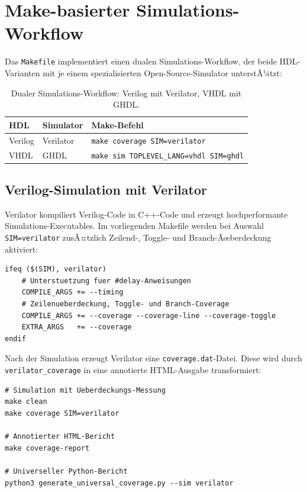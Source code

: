 ﻿\documentclass[12pt,a4paper]{report}
\begin{document}
\section{Make-basierter Simulations-Workflow}
\label{subsec:make_workflow}

Das \texttt{Makefile} implementiert einen dualen Simulations-Workflow, der beide
HDL-Varianten mit je einem spezialisierten Open-Source-Simulator unterstÃ¼tzt:

\begin{table}[H]
\centering
\begin{tabular}{|l|l|l|}
\hline
\textbf{HDL} & \textbf{Simulator} & \textbf{Make-Befehl} \\
\hline
Verilog & Verilator & \texttt{make coverage SIM=verilator} \\
VHDL    & GHDL      & \texttt{make sim TOPLEVEL\_LANG=vhdl SIM=ghdl} \\
\hline
\end{tabular}
\caption{Dualer Simulations-Workflow: Verilog mit Verilator, VHDL mit GHDL.}
\label{tab:sim_workflow}
\end{table}

\subsection{Verilog-Simulation mit Verilator}

Verilator kompiliert Verilog-Code in C++-Code und erzeugt hochperformante
Simulations-Executables. Im vorliegenden Makefile werden bei Auswahl
\texttt{SIM=verilator} zusÃ¤tzlich Zeilend-, Toggle- und Branch-Ãœberdeckung
aktiviert:

\begin{lstlisting}[style=bashstyle, caption={Verilator-spezifische Makefile-Konfiguration}]
ifeq ($(SIM), verilator)
    # Unterstuetzung fuer #delay-Anweisungen
    COMPILE_ARGS += --timing
    # Zeilenueberdeckung, Toggle- und Branch-Coverage
    COMPILE_ARGS += --coverage --coverage-line --coverage-toggle
    EXTRA_ARGS   += --coverage
endif
\end{lstlisting}

Nach der Simulation erzeugt Verilator eine \texttt{coverage.dat}-Datei.
Diese wird durch \texttt{verilator\_coverage} in eine annotierte
HTML-Ausgabe transformiert:

\begin{lstlisting}[style=bashstyle, caption={Ãœberdeckungsbericht mit Verilator}]
# Simulation mit Ueberdeckungs-Messung
make clean
make coverage SIM=verilator

# Annotierter HTML-Bericht
make coverage-report

# Universeller Python-Bericht
python3 generate_universal_coverage.py --sim verilator
\end{lstlisting}
\end{document}
